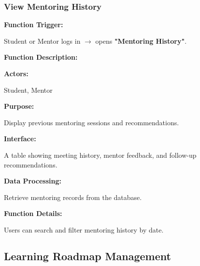\subsubsection{View Mentoring History}

\textbf{Function Trigger:}

Student or Mentor logs in $\rightarrow$ opens \textbf{"Mentoring History"}.

\vspace{0.3cm}

\textbf{Function Description:}

\textbf{Actors:}

Student, Mentor

\vspace{0.2cm}

\textbf{Purpose:}

Display previous mentoring sessions and recommendations.

\vspace{0.2cm}

\textbf{Interface:}

A table showing meeting history, mentor feedback, and follow-up recommendations.

\vspace{0.2cm}

\textbf{Data Processing:}

Retrieve mentoring records from the database.

\vspace{0.3cm}

\textbf{Function Details:}

Users can search and filter mentoring history by date.

%

\subsection{Learning Roadmap Management}

